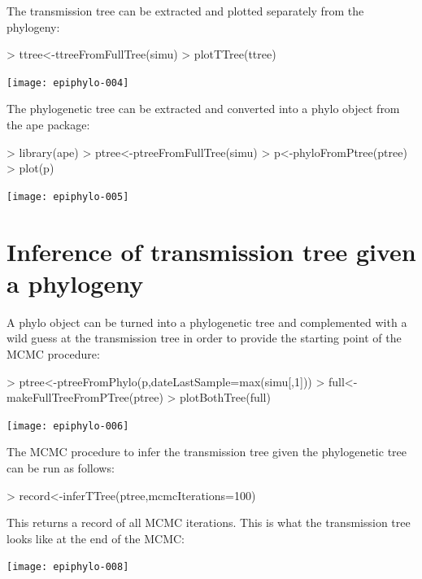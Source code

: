 \documentclass[a4paper]{article}
\begin{document}
The transmission tree can be extracted and plotted separately from the phylogeny:

\begin{Schunk}
\begin{Sinput}
> ttree<-ttreeFromFullTree(simu)
> plotTTree(ttree)
\end{Sinput}
\end{Schunk}
\texttt{[image: epiphylo-004]}

The phylogenetic tree can be extracted and converted into a phylo object from the ape package:

\begin{Schunk}
\begin{Sinput}
> library(ape)
> ptree<-ptreeFromFullTree(simu)
> p<-phyloFromPtree(ptree)
> plot(p)
\end{Sinput}
\end{Schunk}
\texttt{[image: epiphylo-005]}

\section{Inference of transmission tree given a phylogeny}

A phylo object can be turned  into a phylogenetic tree and complemented with a wild guess at the transmission tree in order to provide the starting point of the MCMC procedure:

\begin{Schunk}
\begin{Sinput}
> ptree<-ptreeFromPhylo(p,dateLastSample=max(simu[,1]))
> full<-makeFullTreeFromPTree(ptree)
> plotBothTree(full)
\end{Sinput}
\end{Schunk}
\texttt{[image: epiphylo-006]}

The MCMC procedure to infer the transmission tree given the phylogenetic tree can be run as follows:

\begin{Schunk}
\begin{Sinput}
> record<-inferTTree(ptree,mcmcIterations=100)
\end{Sinput}
\end{Schunk}

This returns a record of all MCMC iterations. This is what the transmission tree looks like at the end of the MCMC:

\begin{Schunk}
\end{Schunk}
\texttt{[image: epiphylo-008]}
\end{document}
